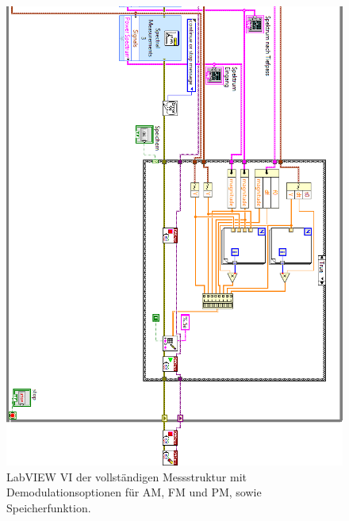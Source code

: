 \begin{figure}[H]
	\centering
	\includegraphics[width=\textwidth]{pic/messstruktur_dafpm3.png}
	\caption{LabVIEW VI der vollständigen Messstruktur mit Demodulationsoptionen für AM, FM und PM, sowie Speicherfunktion.}
	\label{fig:messstruktur_dafpm}	
\end{figure} 

